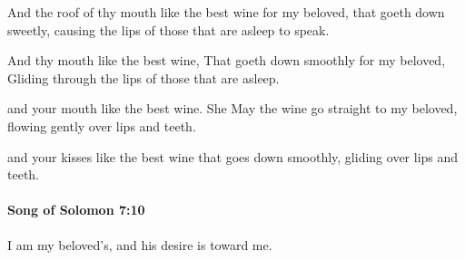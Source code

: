 			And the roof of thy mouth like the best wine for my beloved, that goeth down sweetly, causing the lips of those that are asleep to speak.

			\begin{versebox}
					\item[BHS] 
					\item[LXX] 
					\item[ASV] And thy mouth like the best wine, That goeth down smoothly for my beloved, Gliding through the lips of those that are asleep.
					\item[NIV] and your mouth like the best wine. She May the wine go straight to my beloved, flowing gently over lips and teeth.
					\item[NRSV] and your kisses like the best wine that goes down smoothly, gliding over lips and teeth.
			\end{versebox}

		\paragraph{Song of Solomon 7:10} %
			\label{SONGOFSOLOMON-7-10}

			I am my beloved’s, and his desire is toward me.

